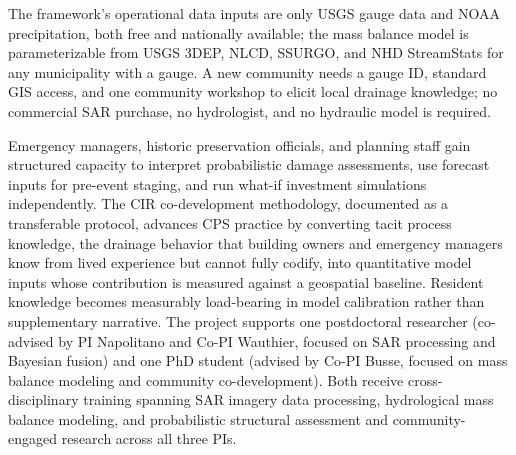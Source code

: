 \documentclass[11pt]{article}
\begin{document}
The framework's operational data inputs are only USGS gauge data and NOAA
precipitation, both free and nationally available;
the mass balance model is parameterizable from USGS 3DEP, NLCD, SSURGO, and NHD
StreamStats for any municipality with a gauge.
A new community needs a gauge ID, standard GIS access, and one community workshop
to elicit local drainage knowledge; no commercial SAR purchase, no hydrologist, and no
hydraulic model is required.

Emergency managers, historic preservation officials, and planning staff gain
structured capacity to interpret probabilistic damage assessments, use forecast
inputs for pre-event staging, and run what-if investment simulations
independently.
The CIR co-development methodology, documented as a transferable protocol, advances
CPS practice by converting tacit process knowledge, the drainage behavior that
building owners and emergency managers know from lived experience but cannot fully
codify, into quantitative model inputs whose contribution is measured against a
geospatial baseline. Resident knowledge becomes measurably load-bearing in model
calibration rather than supplementary narrative.
The project supports one postdoctoral researcher (co-advised by PI Napolitano and
Co-PI Wauthier, focused on SAR processing and Bayesian fusion) and one PhD student
(advised by Co-PI Busse, focused on mass balance modeling and community
co-development). Both receive cross-disciplinary training spanning SAR imagery
data processing, hydrological mass balance modeling, and probabilistic structural
assessment and community-engaged research across all three PIs.

\vspace{-10pt}
\end{document}
